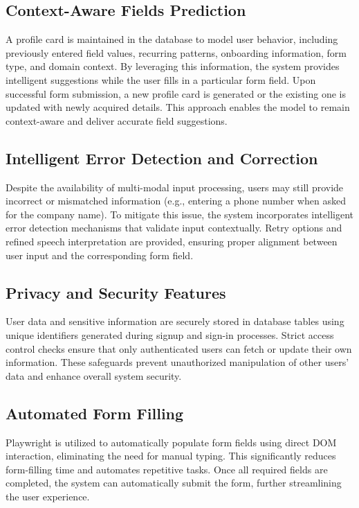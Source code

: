 \documentclass[conference]{IEEEtran}
\begin{document}
\subsection{Context-Aware Fields Prediction}
A profile card is maintained in the database to model user behavior, including previously entered field values, recurring patterns, onboarding information, form type, and domain context. By leveraging this information, the system provides intelligent suggestions while the user fills in a particular form field. Upon successful form submission, a new profile card is generated or the existing one is updated with newly acquired details. This approach enables the model to remain context-aware and deliver accurate field suggestions.

\subsection{Intelligent Error Detection and Correction}
Despite the availability of multi-modal input processing, users may still provide incorrect or mismatched information (e.g., entering a phone number when asked for the company name). To mitigate this issue, the system incorporates intelligent error detection mechanisms that validate input contextually. Retry options and refined speech interpretation are provided, ensuring proper alignment between user input and the corresponding form field.

\subsection{Privacy and Security Features}
User data and sensitive information are securely stored in database tables using unique identifiers generated during signup and sign-in processes. Strict access control checks ensure that only authenticated users can fetch or update their own information. These safeguards prevent unauthorized manipulation of other users’ data and enhance overall system security.

\subsection{Automated Form Filling}
Playwright is utilized to automatically populate form fields using direct DOM interaction, eliminating the need for manual typing. This significantly reduces form-filling time and automates repetitive tasks. Once all required fields are completed, the system can automatically submit the form, further streamlining the user experience.
\end{document}
